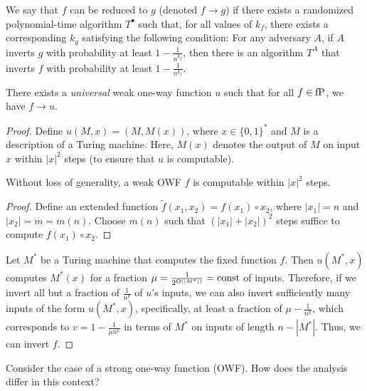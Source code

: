 \begin{definition}
    We say that $f$ can be reduced to $g$ (denoted $f \to g$) if there exists a randomized polynomial-time algorithm $T^{\bullet}$ such that, for all values of $k_f$, there exists a corresponding $k_g$ satisfying the following condition:
    For any adversary $A$, if $A$ inverts $g$ with probability at least $1 - \frac{1}{n^{k_g}}$, then there is an algorithm $T^A$ that inverts $f$ with probability at least $1 - \frac{1}{n^{k_f}}$.
\end{definition}

\begin{theorem}
    There exists a \emph{universal} weak one-way function $u$ such that for all $f \in \operatorname{fP}$, we have $f \to u$.
\end{theorem}

\begin{proof}
    Define $u(M, x) = (M, M(x))$, where $x \in \{0, 1\}^*$ and $M$ is a description of a Turing machine.
    Here, $M(x)$ denotes the output of $M$ on input $x$ within $|x|^2$ steps (to ensure that $u$ is computable).

    \begin{lemma}
        Without loss of generality, a weak OWF $f$ is computable within $|x|^2$ steps.
    \end{lemma}
    
    \begin{proof}
        Define an extended function $\tilde{f}(x_1, x_2) = f(x_1) \circ x_2$, where $|x_1| = n$ and $|x_2| = m = m(n)$.
        Choose $m(n)$ such that $(|x_1| + |x_2|)^2$ steps suffice to compute $f(x_1) \circ x_2$.
    \end{proof}

    Let $M^*$ be a Turing machine that computes the fixed function $f$.
    Then $u(M^*, x)$ computes $M^*(x)$ for a fraction $\mu = \frac{1}{2^{O(|M^{*}|)}} = \operatorname{const}$ of inputs.
    Therefore, if we invert all but a fraction of $\frac{1}{n^{k}}$ of $u$'s inputs, we can also invert sufficiently many inputs of the form $u(M^*, x)$, specifically, at least a fraction of $\mu - \frac{1}{n^{k}}$, which corresponds to $v = 1 - \frac{1}{\mu n^{k}}$ in terms of $M^*$ on inputs of length $n - |M^*|$.
    Thus, we can invert $f$.
\end{proof}

\begin{exercise}
    Consider the case of a strong one-way function (OWF).
    How does the analysis differ in this context?
\end{exercise}

